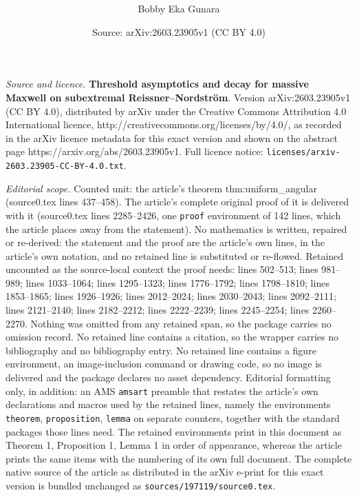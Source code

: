 \documentclass[10pt,a4paper]{amsart}
\title{\textbf{\chg{Threshold asymptotics and decay for massive Maxwell on subextremal Reissner--Nordstr\"om}}}
\author{Bobby Eka Gunara}
\date{Source: arXiv:2603.23905v1 (CC BY 4.0)}
\newcommand{\chg}[1]{#1}
\begin{document}
\maketitle

\noindent\emph{Source and licence.} \textbf{\chg{Threshold asymptotics and decay for massive Maxwell on subextremal Reissner--Nordstr\"om}}. Version arXiv:2603.23905v1 (CC BY 4.0), distributed by arXiv under the Creative Commons Attribution 4.0 International licence, http://creativecommons.org/licenses/by/4.0/, as recorded in the arXiv licence metadata for this exact version and shown on the abstract page https://arxiv.org/abs/2603.23905v1. Full licence notice: \texttt{licenses/arxiv-2603.23905-CC-BY-4.0.txt}.\par\smallskip

\noindent\textit{Editorial scope.} Counted unit: the article's theorem thm:uniform\_angular (source0.tex lines 437--458). The article's complete original proof of it is delivered with it (source0.tex lines 2285--2426, one \texttt{proof} environment of 142 lines, which the article places away from the statement). No mathematics is written, repaired or re-derived: the statement and the proof are the article's own lines, in the article's own notation, and no retained line is substituted or re-flowed.  Retained uncounted as the source-local context the proof needs: lines 502--513; lines 981--989; lines 1033--1064; lines 1295--1323; lines 1776--1792; lines 1798--1810; lines 1853--1865; lines 1926--1926; lines 2012--2024; lines 2030--2043; lines 2092--2111; lines 2121--2140; lines 2182--2212; lines 2222--2239; lines 2245--2254; lines 2260--2270.  Nothing was omitted from any retained span, so the package carries no omission record.  No retained line contains a citation, so the wrapper carries no bibliography and no bibliography entry.  No retained line contains a figure environment, an image-inclusion command or drawing code, so no image is delivered and the package declares no asset dependency.  Editorial formatting only, in addition: an AMS \texttt{amsart} preamble that restates the article's own declarations and macros used by the retained lines, namely the environments \texttt{theorem}, \texttt{proposition}, \texttt{lemma} on separate counters, together with the standard packages those lines need.  The retained environments print in this document as Theorem 1, Proposition 1, Lemma 1 in order of appearance, whereas the article prints the same items with the numbering of its own full document.  The complete native source of the article as distributed in the arXiv e-print for this exact version is bundled unchanged as \texttt{sources/197119/source0.tex}.
\end{document}

